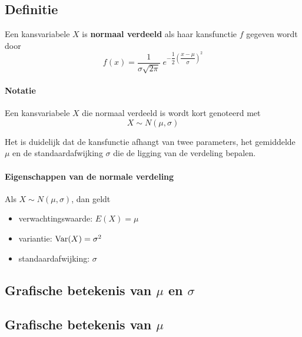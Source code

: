 \documentclass[a4paper,12pt, twoside]{article}
\begin{document}
\pagebreak
\subsection{Definitie}

\begin{mdframed}
Een kansvariabele $X$ is {\bf normaal verdeeld} als haar kansfunctie $f$ gegeven wordt door
$$f(x)=\dfrac{1}{\sigma{\sqrt{2\pi}}}\;e^{-\dfrac{1}{2}\left(\dfrac{x-\mu}{\sigma}\right)^2}$$
\end{mdframed}

\paragraph*{Notatie}
Een kansvariabele $X$ die normaal verdeeld is wordt kort genoteerd met
$$X\sim N(\mu, \sigma)$$

Het is duidelijk dat de kansfunctie afhangt van twee parameters, het gemiddelde $\mu$ en de standaardafwijking $\sigma$ die de ligging van de verdeling bepalen.

\paragraph*{Eigenschappen van de normale verdeling}
\begin{mdframed}
Als $X\sim N(\mu, \sigma)$, dan geldt
\begin{itemize}
  \item verwachtingswaarde: $E(X)=\mu$
  \item variantie: $\Var(X)=\sigma^2$
  \item standaardafwijking: $\sigma$
\end{itemize}
\end{mdframed}

\subsection{Grafische betekenis van $\mu$ en $\sigma$}

\subsection*{Grafische betekenis van $\mu$}
\end{document}
